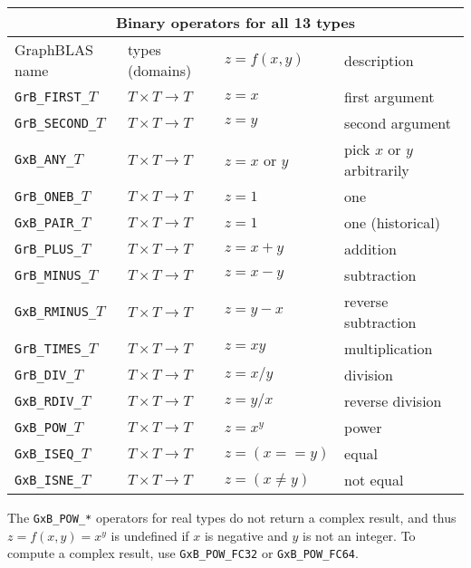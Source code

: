 \documentclass[12pt]{article}
\begin{document}
\vspace{0.2in}
{\footnotesize
\begin{tabular}{|llll|}
\hline
\multicolumn{4}{|c|}{Binary operators for all 13 types} \\
\hline
GraphBLAS name        & types (domains)            & $z=f(x,y)$      & description \\
\hline
\verb'GrB_FIRST_'$T$  & $T \times T \rightarrow T$ & $z = x$         & first argument \\
\verb'GrB_SECOND_'$T$ & $T \times T \rightarrow T$ & $z = y$         & second argument \\
\verb'GxB_ANY_'$T$    & $T \times T \rightarrow T$ & $z = x$ or $y$  & pick $x$ or $y$ arbitrarily \\
\verb'GrB_ONEB_'$T$   & $T \times T \rightarrow T$ & $z = 1$         & one \\
\verb'GxB_PAIR_'$T$   & $T \times T \rightarrow T$ & $z = 1$         & one (historical) \\
\verb'GrB_PLUS_'$T$   & $T \times T \rightarrow T$ & $z = x+y$       & addition \\
\verb'GrB_MINUS_'$T$  & $T \times T \rightarrow T$ & $z = x-y$       & subtraction \\
\verb'GxB_RMINUS_'$T$ & $T \times T \rightarrow T$ & $z = y-x$       & reverse subtraction \\
\verb'GrB_TIMES_'$T$  & $T \times T \rightarrow T$ & $z = xy$        & multiplication \\
\verb'GrB_DIV_'$T$    & $T \times T \rightarrow T$ & $z = x/y$       & division \\
\verb'GxB_RDIV_'$T$   & $T \times T \rightarrow T$ & $z = y/x$       & reverse division \\
\verb'GxB_POW_'$T$    & $T \times T \rightarrow T$ & $z = x^y$       & power \\
\hline
\verb'GxB_ISEQ_'$T$   & $T \times T \rightarrow T$ & $z = (x == y)$  & equal \\
\verb'GxB_ISNE_'$T$   & $T \times T \rightarrow T$ & $z = (x \ne y)$ & not equal \\
\hline
\end{tabular}
}
\vspace{0.2in}

The \verb'GxB_POW_*' operators for real types do not return a complex result,
and thus $z = f(x,y) = x^y$ is undefined if $x$ is negative and $y$ is not an
integer.  To compute a complex result, use \verb'GxB_POW_FC32' or
\verb'GxB_POW_FC64'.
\end{document}
